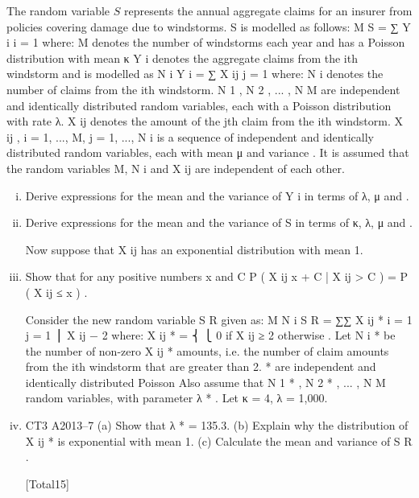 \documentclass[a4paper,12pt]{article}
\begin{document}
\begin{enumerate}

The random variable $S$ represents the annual aggregate claims for an insurer from
policies covering damage due to windstorms. S is modelled as follows:
M
S = ∑ Y i
i = 1
where:
M denotes the number of windstorms each year and has a Poisson distribution
with mean κ
Y i denotes the aggregate claims from the ith windstorm and is modelled as
N i
Y i = ∑ X ij
j = 1
where:
N i denotes the number of claims from the ith
windstorm.
N 1 , N 2 , ... , N M are independent and identically distributed
random variables, each with a Poisson
distribution with rate λ.
X ij denotes the amount of the jth claim from the
ith windstorm.
X ij , i = 1, ..., M, j = 1, ..., N i
is a sequence of independent and identically
distributed random variables, each with mean
μ and variance  .
It is assumed that the random variables M, N i and X ij are independent of each other.
\begin{enumerate}[(i)]
\item  Derive expressions for the mean and the variance of Y i in terms of λ, μ and \sigma.

\item  Derive expressions for the mean and the variance of S in terms of κ, λ, μ
and \sigma.

Now suppose that X ij has an exponential distribution with mean 1.
\item 
Show that for any positive numbers x and C
P ( X ij \leq x + C | X ij > C ) = P ( X ij ≤ x ) .

Consider the new random variable S R given as:
M N i
S R = ∑∑ X ij *
i = 1 j = 1
⎪ X ij − 2
where: X ij * = ⎨
⎩ 0
if X ij ≥ 2
otherwise
.
Let N i * be the number of non-zero X ij * amounts, i.e. the number of claim amounts
from the ith windstorm that are greater than 2.
*
are independent and identically distributed Poisson
Also assume that N 1 * , N 2 * , ... , N M
random variables, with parameter λ * .
Let κ = 4, λ = 1,000.
\item %
CT3 A2013–7
(a) Show that λ * = 135.3.
(b) Explain why the distribution of X ij * is exponential with mean 1.
(c) Calculate the mean and variance of S R .

[Total15]
\end{enumerate}


\end{enumerate}
\end{document}
